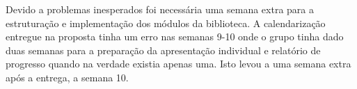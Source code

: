 Devido a problemas inesperados foi necessária uma semana extra para a estruturação e implementação dos módulos da biblioteca.
A calendarização entregue na proposta tinha um erro nas semanas 9-10 onde o grupo tinha dado duas semanas para a preparação da apresentação individual e relatório de progresso quando na verdade existia apenas uma. Isto levou a uma semana extra após a entrega, a semana 10.
